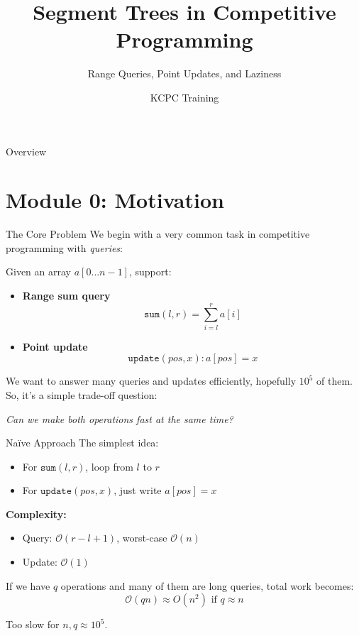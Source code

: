 \documentclass[aspectratio=169]{beamer}
\title{Segment Trees in Competitive Programming}
\subtitle{Range Queries, Point Updates, and Laziness}
\author{KCPC Training}
\date{}
\begin{document}
\begin{frame}
    \titlepage
\end{frame}

\begin{frame}{Overview}
    \tableofcontents
\end{frame}


\section{Module 0: Motivation}

\begin{frame}{The Core Problem}
    We begin with a very common task in competitive programming with \textit{queries}:

    Given an array \(a[0 \dots n-1]\), support:
    \begin{itemize}
        \item \textbf{Range sum query}
        $$
        \texttt{sum}(l,r) = \sum_{i=l}^{r} a[i]
        $$
        \item \textbf{Point update}
        $$
        \texttt{update}(pos,x): a[pos] = x
        $$
    \end{itemize}

    We want to answer many queries and updates efficiently, hopefully $10^5$ of them. So, it's a simple trade-off question:

    \begin{center}
        \textit{Can we make both operations fast at the same time?}
    \end{center}
\end{frame}

\begin{frame}{Naïve Approach}
    The simplest idea:
    \begin{itemize}
        \item For \(\texttt{sum}(l,r)\), loop from \(l\) to \(r\)
        \item For \(\texttt{update}(pos,x)\), just write \(a[pos] = x\)
    \end{itemize}

    \textbf{Complexity:}
    \begin{itemize}
        \item Query: \(\mathcal{O}(r-l+1)\), worst-case \(\mathcal{O}(n)\)
        \item Update: \(\mathcal{O}(1)\)
    \end{itemize}

    If we have \(q\) operations and many of them are long queries, total work becomes:
    $$
    \mathcal{O}(qn) \approx O(n^2) \text{ if } q \approx n
    $$

    Too slow for \(n, q \approx 10^5\).
\end{frame}
\end{document}
